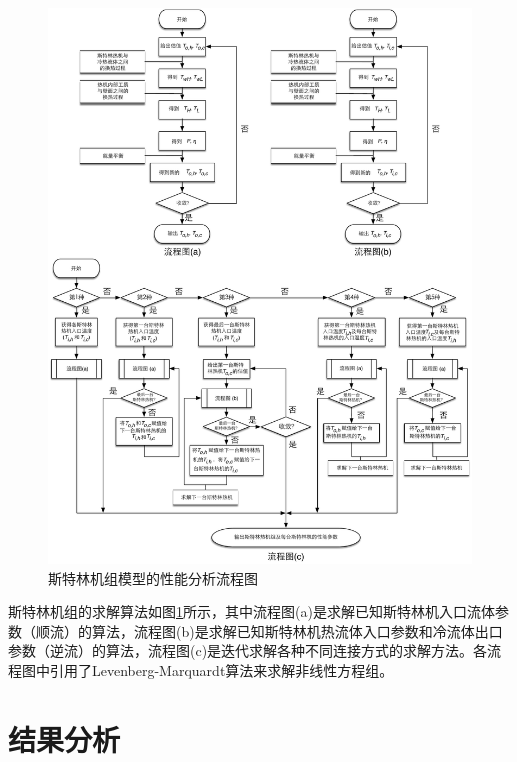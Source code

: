 \noindent \begin{figure}[htbp]
\begin{center}
	\includegraphics[width = 1.0\columnwidth]{fig/FlowChart}
	\caption{斯特林机组模型的性能分析流程图}
	\label{fig:Flowchart}
\end{center}
\end{figure}

斯特林机组的求解算法如图\ref{fig:Flowchart}所示，其中流程图(a)是求解已知斯特林机入口流体参数（顺流）的算法，流程图(b)是求解已知斯特林机热流体入口参数和冷流体出口参数（逆流）的算法，流程图(c)是迭代求解各种不同连接方式的求解方法。各流程图中引用了Levenberg-Marquardt算法来求解非线性方程组。

\section{结果分析}

